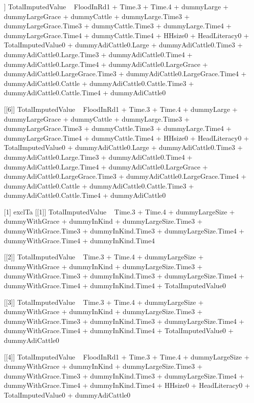 \begin{Schunk}
\begin{Soutput}
[[5]]
TotalImputedValue ~ FloodInRd1 + Time.3 + Time.4 + dummyLarge + 
    dummyLargeGrace + dummyCattle + dummyLarge.Time3 + dummyLargeGrace.Time3 + 
    dummyCattle.Time3 + dummyLarge.Time4 + dummyLargeGrace.Time4 + 
    dummyCattle.Time4 + HHsize0 + HeadLiteracy0 + TotalImputedValue0 + 
    dummyAdiCattle0.Large + dummyAdiCattle0.Time3 + dummyAdiCattle0.Large.Time3 + 
    dummyAdiCattle0.Time4 + dummyAdiCattle0.Large.Time4 + dummyAdiCattle0.LargeGrace + 
    dummyAdiCattle0.LargeGrace.Time3 + dummyAdiCattle0.LargeGrace.Time4 + 
    dummyAdiCattle0.Cattle + dummyAdiCattle0.Cattle.Time3 + dummyAdiCattle0.Cattle.Time4 + 
    dummyAdiCattle0

[[6]]
TotalImputedValue ~ FloodInRd1 + Time.3 + Time.4 + dummyLarge + 
    dummyLargeGrace + dummyCattle + dummyLarge.Time3 + dummyLargeGrace.Time3 + 
    dummyCattle.Time3 + dummyLarge.Time4 + dummyLargeGrace.Time4 + 
    dummyCattle.Time4 + HHsize0 + HeadLiteracy0 + TotalImputedValue0 + 
    dummyAdiCattle0.Large + dummyAdiCattle0.Time3 + dummyAdiCattle0.Large.Time3 + 
    dummyAdiCattle0.Time4 + dummyAdiCattle0.Large.Time4 + dummyAdiCattle0.LargeGrace + 
    dummyAdiCattle0.LargeGrace.Time3 + dummyAdiCattle0.LargeGrace.Time4 + 
    dummyAdiCattle0.Cattle + dummyAdiCattle0.Cattle.Time3 + dummyAdiCattle0.Cattle.Time4 + 
    dummyAdiCattle0

[1] exclTa
[[1]]
TotalImputedValue ~ Time.3 + Time.4 + dummyLargeSize + dummyWithGrace + 
    dummyInKind + dummyLargeSize.Time3 + dummyWithGrace.Time3 + 
    dummyInKind.Time3 + dummyLargeSize.Time4 + dummyWithGrace.Time4 + 
    dummyInKind.Time4

[[2]]
TotalImputedValue ~ Time.3 + Time.4 + dummyLargeSize + dummyWithGrace + 
    dummyInKind + dummyLargeSize.Time3 + dummyWithGrace.Time3 + 
    dummyInKind.Time3 + dummyLargeSize.Time4 + dummyWithGrace.Time4 + 
    dummyInKind.Time4 + TotalImputedValue0

[[3]]
TotalImputedValue ~ Time.3 + Time.4 + dummyLargeSize + dummyWithGrace + 
    dummyInKind + dummyLargeSize.Time3 + dummyWithGrace.Time3 + 
    dummyInKind.Time3 + dummyLargeSize.Time4 + dummyWithGrace.Time4 + 
    dummyInKind.Time4 + TotalImputedValue0 + dummyAdiCattle0

[[4]]
TotalImputedValue ~ FloodInRd1 + Time.3 + Time.4 + dummyLargeSize + 
    dummyWithGrace + dummyInKind + dummyLargeSize.Time3 + dummyWithGrace.Time3 + 
    dummyInKind.Time3 + dummyLargeSize.Time4 + dummyWithGrace.Time4 + 
    dummyInKind.Time4 + HHsize0 + HeadLiteracy0 + TotalImputedValue0 + 
    dummyAdiCattle0


\end{Soutput}
\end{Schunk}
